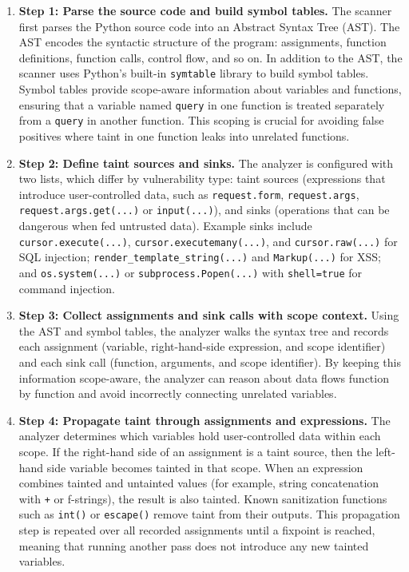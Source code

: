 \begin{enumerate}
  \item \textbf{Step 1: Parse the source code and build symbol tables.}
  The scanner first parses the Python source code into an Abstract Syntax Tree (AST).
  The AST encodes the syntactic structure of the program: assignments, function definitions,
  function calls, control flow, and so on. In addition to the AST, the scanner uses Python's
  built-in \texttt{symtable} library to build symbol tables. Symbol tables provide scope-aware
  information about variables and functions, ensuring that a variable named \texttt{query}
  in one function is treated separately from a \texttt{query} in another function. This scoping
  is crucial for avoiding false positives where taint in one function leaks into unrelated functions.

  \item \textbf{Step 2: Define taint sources and sinks.}
  The analyzer is configured with two lists, which differ by vulnerability type:
  taint sources (expressions that introduce user-controlled data, such as \texttt{request.form},
  \texttt{request.args}, \texttt{request.args.get(...)} or \texttt{input(...)}), and sinks
  (operations that can be dangerous when fed untrusted data). Example sinks include
  \texttt{cursor.execute(...)}, \texttt{cursor.executemany(...)}, and \texttt{cursor.raw(...)}
  for SQL injection; \texttt{render\_template\_string(...)} and \texttt{Markup(...)} for XSS;
  and \texttt{os.system(...)} or \texttt{subprocess.Popen(...)} with \texttt{shell=true} for
  command injection.

  \item \textbf{Step 3: Collect assignments and sink calls with scope context.}
  Using the AST and symbol tables, the analyzer walks the syntax tree and records each
  assignment (variable, right-hand-side expression, and scope identifier) and each sink
  call (function, arguments, and scope identifier). By keeping this information scope-aware,
  the analyzer can reason about data flows function by function and avoid incorrectly
  connecting unrelated variables.

  \item \textbf{Step 4: Propagate taint through assignments and expressions.}
  The analyzer determines which variables hold user-controlled data within each scope.
  If the right-hand side of an assignment is a taint source, then the left-hand side variable
  becomes tainted in that scope. When an expression combines tainted and untainted values
  (for example, string concatenation with \texttt{+} or f-strings), the result is also tainted.
  Known sanitization functions such as \texttt{int()} or \texttt{escape()} remove taint from
  their outputs. This propagation step is repeated over all recorded assignments until a
  fixpoint is reached, meaning that running another pass does not introduce any new tainted
  variables.


\end{enumerate}
